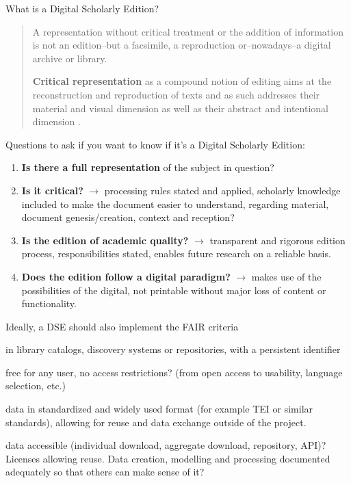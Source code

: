 \begin{frame}[allowframebreaks]{What is a Digital Scholarly Edition?}
\begin{block}{\cite{sahleDigitalEdition2016}}    
    \begin{quote}
        A representation without \lbrack{}critical\rbrack{} treatment or the addition of information is not an edition–but a facsimile, a reproduction or–nowadays–a digital archive or library. 
        
        \textbf{Critical representation} as a compound notion of editing aims at the reconstruction and reproduction of texts and as such addresses their material and visual dimension as well as their abstract and intentional dimension \parencite{sahleDigitalEdition2016}. 
    \end{quote}
\end{block}

\framebreak

Questions to ask if you want to know if it's a Digital Scholarly Edition:
\begin{enumerate}
    \item \textbf{Is there a full representation} of the subject in question?
    \item \textbf{Is it critical?} $\to$ processing rules stated and applied, scholarly knowledge included to make the document easier to understand, regarding material, document genesis/creation, context and reception?
    \item \textbf{Is the edition of academic quality?} $\to$ transparent and rigorous edition process, responsibilities stated, enables future research on a reliable basis.
    \item \textbf{Does the edition follow a digital paradigm?} $\to$ makes use of the possibilities of the digital, not printable without major loss of content or functionality.
\end{enumerate}

\framebreak

\begin{alertblock}{Ideally, a DSE should also implement the FAIR criteria}
\begin{description}\footnotesize
    \item[Findable.] in library catalogs, discovery systems or repositories, with a persistent identifier
    \item[Accessible.] free for any user, no access restrictions? (from open access to usability, language selection, etc.) 
    \item[Interoperable.] data in standardized and widely used format (for example TEI or similar standards), allowing for reuse and data exchange outside of the project. 
    \item[Reusable.] data accessible (individual download, aggregate download, repository, API)? Licenses allowing reuse. Data creation, modelling and processing documented adequately so that others can make sense of it? 
\end{description}
\end{alertblock}


\end{frame}

